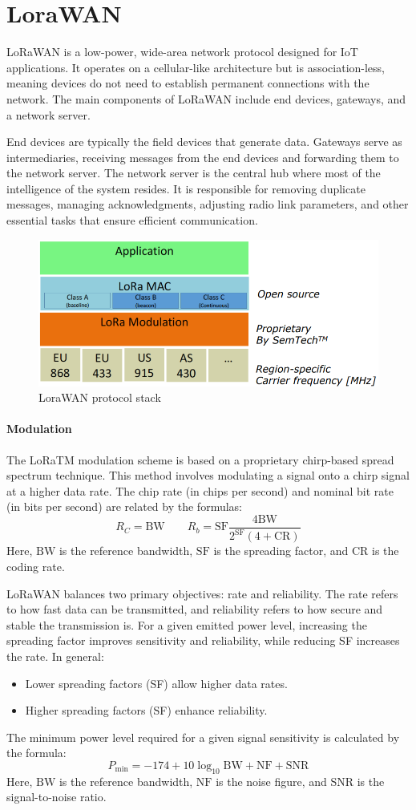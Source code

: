 \section{LoraWAN}

LoRaWAN is a low-power, wide-area network protocol designed for IoT applications. 
It operates on a cellular-like architecture but is association-less, meaning devices do not need to establish permanent connections with the network. 
The main components of LoRaWAN include end devices, gateways, and a network server.

End devices are typically the field devices that generate data. 
Gateways serve as intermediaries, receiving messages from the end devices and forwarding them to the network server. 
The network server is the central hub where most of the intelligence of the system resides.
It is responsible for removing duplicate messages, managing acknowledgments, adjusting radio link parameters, and other essential tasks that ensure efficient communication.

\begin{figure}[H]
    \centering
    \includegraphics[width=0.5\linewidth]{images/lora.png}
    \caption{LoraWAN protocol stack}
\end{figure}

\paragraph*{Modulation}
The LoRaTM modulation scheme is based on a proprietary chirp-based spread spectrum technique. 
This method involves modulating a signal onto a chirp signal at a higher data rate. 
The chip rate (in chips per second) and nominal bit rate (in bits per second) are related by the formulas:
\[R_C=\text{BW}\qquad R_b=\text{SF}\dfrac{4\text{BW}}{2^{\text{SF}}(4+\text{CR})}\]
Here, $\text{BW}$ is the reference bandwidth, $\text{SF}$ is the spreading factor, and $\text{CR}$ is the coding rate. 

LoRaWAN balances two primary objectives: rate and reliability. 
The rate refers to how fast data can be transmitted, and reliability refers to how secure and stable the transmission is. 
For a given emitted power level, increasing the spreading factor improves sensitivity and reliability, while reducing SF increases the rate.
In general:
\begin{itemize}
    \item Lower spreading factors (SF) allow higher data rates.
    \item Higher spreading factors (SF) enhance reliability.
\end{itemize}
\noindent The minimum power level required for a given signal sensitivity is calculated by the formula:
\[P_{\min}=-174+10\log_{10}\text{BW}+\text{NF}+\text{SNR}\]
Here, $\text{BW}$ is the reference bandwidth, $\text{NF}$ is the noise figure, and $\text{SNR}$ is the signal-to-noise ratio. 

